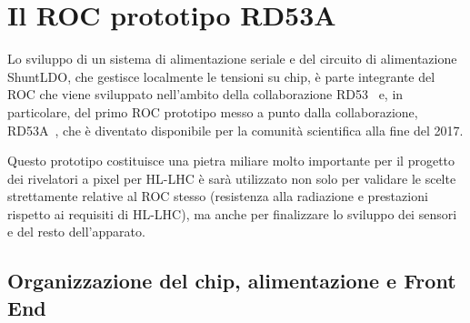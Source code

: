 \chapter{Il ROC prototipo RD53A}
\label{cap:RD53A}

Lo sviluppo di un sistema di alimentazione seriale e del circuito di alimentazione ShuntLDO, che gestisce localmente le tensioni su chip, è parte integrante del ROC che viene sviluppato nell'ambito della collaborazione RD53~\cite{RD53} e, in particolare, del primo ROC prototipo messo a punto dalla collaborazione, RD53A~\cite{RD53A}, che \`e diventato disponibile per la comunit\`a scientifica alla fine del 2017.

Questo prototipo costituisce una pietra miliare molto importante per il progetto dei rivelatori a pixel per HL-LHC \`e sar\`a utilizzato non solo per validare le scelte strettamente relative al ROC stesso (resistenza alla radiazione e prestazioni rispetto ai requisiti di HL-LHC), ma anche per finalizzare lo sviluppo dei sensori e del resto dell'apparato.

\section{Organizzazione del chip, alimentazione e Front End}
\label{Organizzazionechip}


